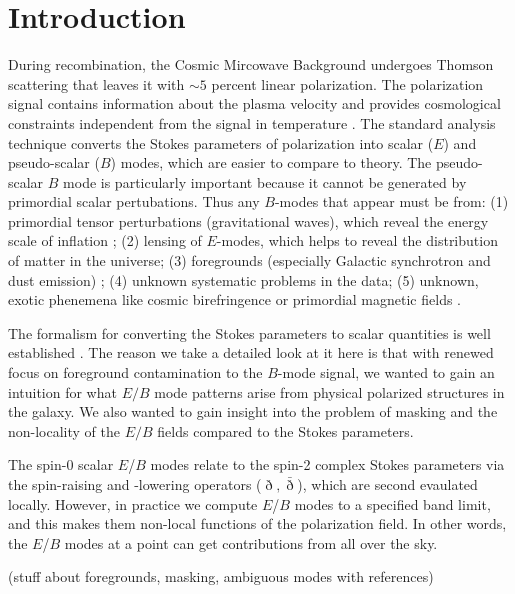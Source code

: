 \section{Introduction}
During recombination, the Cosmic Mircowave Background undergoes Thomson scattering that leaves it with $\sim 5$ percent linear polarization.  The polarization signal contains information about the plasma velocity and provides cosmological constraints independent from the signal in temperature \citep{1997NewA....2..323H}.  The standard analysis technique converts the Stokes parameters of polarization into scalar ($E$) and pseudo-scalar ($B$) modes, which are easier to compare to theory.  The pseudo-scalar $B$ mode is particularly important because it cannot be generated by primordial scalar pertubations.  Thus any $B$-modes that appear must be from:
(1) primordial tensor perturbations (gravitational waves), which reveal the energy scale of inflation
\citep{1997PhRvD..56..596H,1997PhRvL..78.2054S};
(2) lensing of $E$-modes, which helps to reveal the distribution of matter in the universe;
(3) foregrounds (especially Galactic synchrotron and dust emission)
\citep{2016A&A...586A.133P};
(4) unknown systematic problems in the data;
(5) unknown, exotic phenemena like cosmic birefringence or primordial magnetic fields
\citep{1996ApJ...469....1K,1999PhRvL..83.1506L,2004ApJ...616....1C,2014MNRAS.438.2508P}.
 
 
The formalism for converting the Stokes parameters to scalar quantities is well established \citep{1997PhRvD..55.7368K,1997PhRvD..55.1830Z}.  The reason we take a detailed look at it here is that with renewed focus on foreground contamination to the $B$-mode signal, we wanted to gain an intuition for what $E/B$ mode patterns arise from physical polarized structures in the galaxy.  We also wanted to gain insight into the problem of masking and the non-locality of the $E/B$ fields compared to the Stokes parameters.

The spin-0 scalar $E$/$B$ modes relate to the spin-2 complex Stokes parameters via the spin-raising and -lowering operators ($\eth,\bar \eth$), which are second  evaulated locally.  However, in practice we compute $E$/$B$ modes to a specified band limit, and this makes them non-local functions of the polarization field.  In other words, the $E$/$B$ modes at a point can get contributions from all over the sky.

(stuff about foregrounds, masking, ambiguous modes with references)
 
